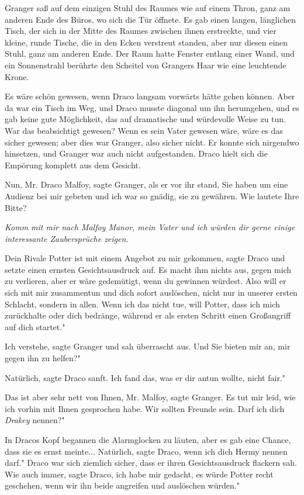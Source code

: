 Granger saß auf dem einzigen Stuhl des Raumes wie auf einem Thron, ganz am
anderen Ende des Büros, wo sich die Tür öffnete. Es gab einen langen, länglichen
Tisch, der sich in der Mitte des Raumes zwischen ihnen erstreckte, und vier
kleine, runde Tische, die in den Ecken verstreut standen, aber nur diesen einen
Stuhl, ganz am anderen Ende. Der Raum hatte Fenster entlang einer Wand, und ein
Sonnenstrahl berührte den Scheitel von Grangers Haar wie eine leuchtende Krone.

Es wäre schön gewesen, wenn Draco langsam vorwärts hätte gehen können. Aber da
war ein Tisch im Weg, und Draco musste diagonal um ihn herumgehen, und es gab
keine gute Möglichkeit, das auf dramatische und würdevolle Weise zu tun. War das
beabsichtigt gewesen? Wenn es sein Vater gewesen wäre, wäre es das sicher
gewesen; aber dies war Granger, also sicher nicht. Er konnte sich nirgendwo
hinsetzen, und Granger war auch nicht aufgestanden. Draco hielt sich die
Empörung komplett aus dem Gesicht.

\glqq{}Nun, Mr. Draco Malfoy\grqq{}, sagte Granger, als er vor ihr stand, \glqq{}
Sie haben um eine Audienz bei mir gebeten und ich war so gnädig, sie zu
gewähren. Wie lautete Ihre Bitte?\grqq{}

\emph{Komm mit mir nach Malfoy Manor, mein Vater und ich würden dir gerne einige
interessante Zaubersprüche zeigen.}

\glqq{}Dein Rivale Potter ist mit einem Angebot zu mir gekommen\grqq{}, sagte
Draco und setzte einen ernsten Gesichtsausdruck auf. \glqq{}Es macht ihm nichts
aus, gegen mich zu verlieren, aber er wäre gedemütigt, wenn du gewinnen würdest.
Also will er sich mit mir zusammentun und dich sofort auslöschen, nicht nur in
unserer ersten Schlacht, sondern in allen. Wenn ich das nicht tue, will Potter,
dass ich mich zurückhalte oder dich bedränge, während er als ersten Schritt
einen Großangriff auf dich startet."

\glqq{}Ich verstehe\grqq{}, sagte Granger und sah überrascht aus. \glqq{}Und Sie
bieten mir an, mir gegen ihn zu helfen?"

\glqq{}Natürlich\grqq{}, sagte Draco sanft. \glqq{}Ich fand das, was er dir antun
wollte, nicht fair."

\glqq{}Das ist aber sehr nett von Ihnen, Mr. Malfoy\grqq{}, sagte Granger. \glqq{}
Es tut mir leid, wie ich vorhin mit Ihnen gesprochen habe. Wir sollten Freunde
sein. Darf ich dich \emph{Drakey} nennen?"

In Dracos Kopf begannen die Alarmglocken zu läuten, aber es gab eine Chance,
dass sie es ernst meinte... \glqq{}Natürlich\grqq{}, sagte Draco, \glqq{}wenn ich
dich Hermy nennen darf." Draco war sich ziemlich sicher, dass er ihren
Gesichtsausdruck flackern sah. \glqq{}Wie auch immer\grqq{}, sagte Draco, \glqq{}
ich habe mir gedacht, es würde Potter recht geschehen, wenn wir ihn beide
angreifen und auslöschen würden."

